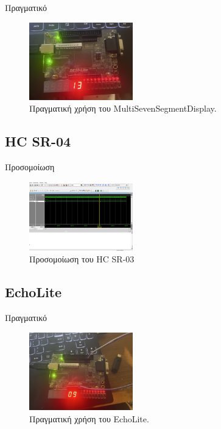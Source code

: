 \documentclass[conference]{IEEEtran}
\begin{document}
Πραγματικό
\begin{figure}[H]
	\centerline{\includegraphics[angle=90, width=0.4\textwidth]{assets/mssd-real.jpeg}}
	\caption{Πραγματική χρήση του MultiSevenSegmentDisplay.}
\end{figure}

\subsection{HC SR-04}

Προσομοίωση
\begin{figure}[H]
	\centerline{\includegraphics[width=0.4\textwidth]{assets/hcsr04-tb.png}}
	\caption{Προσομοίωση του HC SR-03}
\end{figure}

\subsection{EchoLite}

Πραγματικό
\begin{figure}[H]
	\centerline{\includegraphics[angle=90, width=0.4\textwidth]{assets/echolite-real.jpeg}}
	\caption{Πραγματική χρήση του EchoLite.}
\end{figure}
\end{document}
